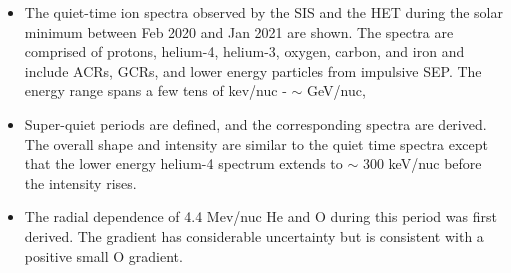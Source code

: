 \begin{itemize}
    \item The quiet-time ion spectra observed by the \ac{SIS} and the \ac{HET} during the solar minimum between Feb 2020 and Jan 2021 are shown. The spectra are comprised of protons, helium-4, helium-3, oxygen, carbon, and iron and include \acp{ACR}, \acp{GCR}, and lower energy particles from impulsive \ac{SEP}. The energy range spans a few tens of kev/nuc - $\sim$ GeV/nuc,
    \item Super-quiet periods are defined, and the corresponding spectra are derived. The overall shape and intensity are similar to the quiet time spectra except that the lower energy helium-4 spectrum extends to $\sim$ 300 keV/nuc before the intensity rises.
    \item The radial dependence of 4.4 Mev/nuc He and O during this period was first derived. The gradient has considerable uncertainty but is consistent with a positive small O gradient.
\end{itemize}



